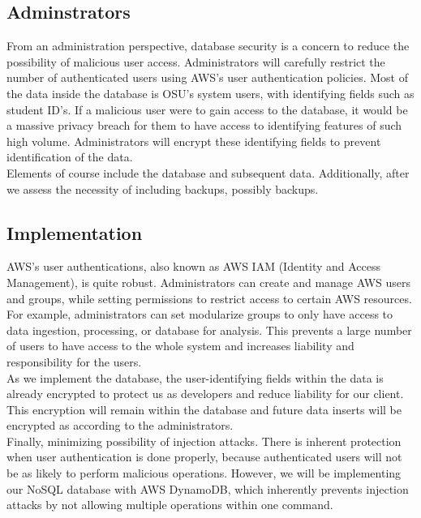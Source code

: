     \subsection{Adminstrators}
    From an administration perspective, database security is a concern to reduce the possibility of malicious user access. Administrators will carefully restrict the number of authenticated users using AWS’s user authentication policies. Most of the data inside the database is OSU’s system users, with identifying fields such as student ID’s. If a malicious user were to gain access to the database, it would be a massive privacy breach for them to have access to identifying features of such high volume. Administrators will encrypt these identifying fields to prevent identification of the data.\\
    
    \noindent Elements of course include the database and subsequent data. Additionally, after we assess the necessity of including backups, possibly backups. 
    
    \subsection{Implementation}
    AWS’s user authentications, also known as AWS IAM (Identity and Access Management), is quite robust. Administrators can create and manage AWS users and groups, while setting permissions to restrict access to certain AWS resources\cite{i3}. For example, administrators can set modularize groups to only have access to data ingestion, processing, or database for analysis. This prevents a large number of users to have access to the whole system and increases liability and responsibility for the users.\\
    
	\noindent As we implement the database, the user-identifying fields within the data is already encrypted to protect us as developers and reduce liability for our client. This encryption will remain within the database and future data inserts will be encrypted as according to the administrators.\\
    
	\noindent Finally, minimizing possibility of injection attacks. There is inherent protection when user authentication is done properly, because authenticated users will not be as likely to perform malicious operations. However, we will be implementing our NoSQL database with AWS DynamoDB, which inherently prevents injection attacks by not allowing multiple operations within one command.
    
